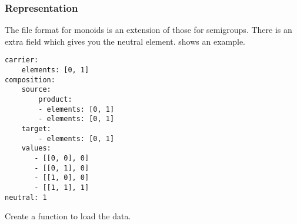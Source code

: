 





\subsubsection*{Representation}
%

The file format for monoids is an extension of those for semigroups.
There is an extra field  which gives you the neutral element.
 shows an example.

\begin{longcode}
  \caption{}
  \label{lst:monoid1}
  \begin{verbatim}
carrier:
    elements: [0, 1]
composition:
    source:
        product:
        - elements: [0, 1]
        - elements: [0, 1]
    target:
        - elements: [0, 1]
    values:
       - [[0, 0], 0]
       - [[0, 1], 0]
       - [[1, 0], 0]
       - [[1, 1], 1]
neutral: 1
  \end{verbatim}
\end{longcode}



\begin{codeexercise}
  Create a function to load the data.
%
\end{codeexercise}


